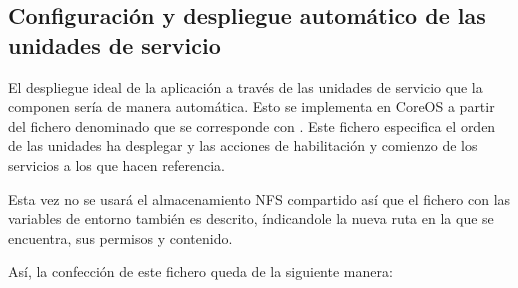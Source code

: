 \subsection{Configuración y despliegue automático de las unidades de servicio}

El despliegue ideal de la aplicación a través de las unidades de servicio que la componen sería de manera automática. Esto se implementa en CoreOS a partir del fichero denominado  que se corresponde con . Este fichero especifica el orden de las unidades ha desplegar y las acciones de habilitación y comienzo de los servicios a los que hacen referencia.

Esta vez no se usará el almacenamiento NFS compartido así que el fichero con las variables de entorno también es descrito, índicandole la nueva ruta en la que se encuentra, sus permisos y contenido. 

Así, la confección de este fichero queda de la siguiente manera:

